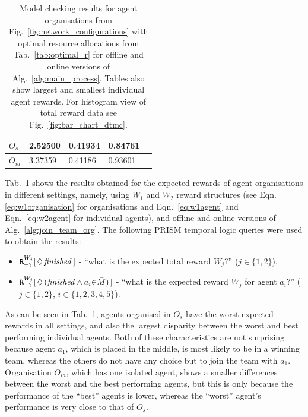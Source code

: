 \documentclass{llncs}
\begin{document}
\begin{table}[t]
{\begin{tabular}{ | l | l | l | l | l |}
    $O_s$  & 2.52500 & 0.41934 & 0.84761  \\ \hline
    $O_{ia}$  & 3.37359 & 0.41186 & 0.93601  \\ \hline
\end{tabular}
}
\caption{Model checking results for agent organisations from Fig.~\ref{fig:network_configurations} with optimal resource allocations from Tab.~\ref{tab:optimal_r} for offline and online versions of Alg.~\ref{alg:main_process}. Tables also show largest and smallest individual agent rewards. For histogram view of total reward data see Fig.~\ref{fig:bar_chart_dtmc}.}
\label{tab:dtmc_results}
\end{table}

Tab.~\ref{tab:dtmc_results} shows the results obtained for the expected rewards of agent organisations in different settings, namely, using $W_1$ and $W_2$ reward structures (see Eqn. \eqref{eq:w1organisation} %
for organisations and Eqn.~\eqref{eq:w1agent} and Eqn.~\eqref{eq:w2agent} for individual agents), and offline and online versions of Alg.~\ref{alg:join_team_org}. The following PRISM temporal logic queries were used to obtain the results:
\begin{itemize}
 \item ${\tt R}_{=?}^{W_{j}}[\,\Diamond\,\mathit{finished}\,]$ -
``what is the expected total reward $W_j$?'' ($j\in\{1,2\}$),
 \item ${\tt R}_{=?}^{W_{j}}[\,\Diamond\,(\mathit{finished} \wedge a_i {\in} \bar{M}) \,]$ -
``what is the expected reward $W_j$ for agent $a_i$?'' ($j\in\{1,2\}$, $i\in\{1,2,3,4,5\}$).
\end{itemize}
As can be seen in Tab.~\ref{tab:dtmc_results}, agents organised in $O_s$ have the worst expected rewards in all settings, and also the largest disparity between the worst and best performing individual agents. Both of these characteristics are not surprising because agent $a_1$, which is placed in the middle, is most likely to be in a winning team, whereas the others do not have any choice but to join the team with $a_1$. Organisation $O_{ia}$, which has one isolated agent, shows a smaller differences between the worst and the best performing agents, but this is only because the performance of the ``best'' agents is lower, whereas the ``worst'' agent's performance is very close to that of $O_s$.
\end{document}
